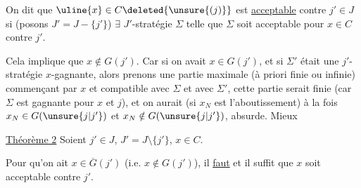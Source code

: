 
On dit que $\uline{x}\in C\deleted{\unsure{(j)}}$ est \uline{acceptable} contre $j'\in J$ si \deleted{$\exists$} (posons $J'=J-\{j'\}$)  $\exists$ $J'$-stratégie $\Sigma$ telle que $\Sigma$ soit acceptable pour $x\in C$ contre $j'$.

Cela implique que $x\notin G(j')$. Car si on avait $x\in G(j')$,  et si $\Sigma'$ était une $j'$-stratégie $x$-gagnante, alors prenons une partie maximale (à priori finie ou infinie) commençant par $x$ et compatible avec $\Sigma$ et avec $\Sigma'$, cette partie serait finie (car $\Sigma$ est gagnante pour $x$ et $j$), et on aurait (si $x_N$ est l'aboutissement) à la fois $x_N\in G(\unsure{j|j'})$ et $x_N\notin G(\unsure{j|j'})$, absurde. Mieux

\uline{Théorème 2} Soient $j'\in J$, $J'=J\setminus\{j'\}$, $x\in C$.

Pour qu'on ait $x\in\overline G(j')$ (i.e. $x\notin G(j')$), il \uline{faut} et il suffit que $x$ soit acceptable contre $j'$.
